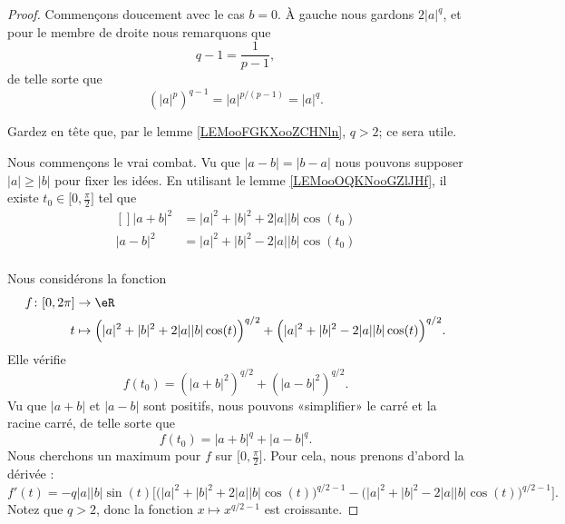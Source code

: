 \begin{proof}
    Commençons doucement avec le cas \( b=0\). À gauche nous gardons \( 2| a |^q\), et pour le membre de droite nous remarquons que
    \begin{equation}
        q-1=\frac{ 1 }{ p-1 }, 
    \end{equation}
    de telle sorte que
    \begin{equation}
        (| a |^p)^{q-1}=| a |^{p/(p-1)}=|a|^q.
    \end{equation}

    Gardez en tête que, par le lemme \ref{LEMooFGKXooZCHNln}, \( q>2\); ce sera utile.
    
    Nous commençons le vrai combat. Vu que \( | a-b |=| b-a |\) nous pouvons supposer \( | a |\geq | b |\) pour fixer les idées. En utilisant le lemme \ref{LEMooOQKNooGZlJHf}, il existe \( t_0\in\mathopen[ 0 , \frac{ \pi }{2} \mathclose]\) tel que
    \begin{equation}
        \begin{aligned}[]
            | a+b |^2&=| a |^2+| b |^2+2| a | |b |\cos(t_0)\\
            | a-b |^2&=| a |^2+| b |^2-2| a | |b |\cos(t_0)\\
        \end{aligned}
    \end{equation}
    
    Nous considérons la fonction
    \begin{equation}
        \begin{aligned}
            f\colon \mathopen[ 0 , 2\pi \mathclose]&\to \eR \\
            t&\mapsto \Big( | a |^2+| b |^2+2| a | |b |\cos(t) \Big)^{q/2}+  \Big( | a |^2+| b |^2-2| a | |b |\cos(t) \Big)^{q/2}.
        \end{aligned}
    \end{equation}
    Elle vérifie
    \begin{equation}
        f(t_0)=(| a+b |^2)^{q/2}+(| a-b |^2)^{q/2}.
    \end{equation}
    Vu que \( | a+b |\) et \( | a-b |\) sont positifs, nous pouvons «simplifier» le carré et la racine carré, de telle sorte que
    \begin{equation}
        f(t_0)=| a+b |^q+| a-b |^q.
    \end{equation}
    Nous cherchons un maximum pour \( f\) sur \( \mathopen[ 0 , \frac{ \pi }{2} \mathclose]\). Pour cela, nous prenons d'abord la dérivée :
    \begin{equation}
        f'(t)=-q| a | |b |\sin(t)\Big[   \big( | a |^2+| b |^2+2| a | |b |\cos(t) \big)^{q/2-1}-\big( | a |^2+| b |^2-2| a | |b |\cos(t) \big)^{q/2-1}    \Big].
    \end{equation}
    Notez que \( q>2\), donc la fonction \( x\mapsto x^{q/2-1}\) est croissante.


\end{proof}
